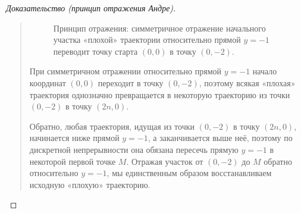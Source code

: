 \begin{proof}[Доказательство (принцип отражения Андре)]
\begin{quote}
\begin{figure}[H]
            \caption{Принцип отражения: симметричное отражение начального 
            участка «плохой» траектории относительно прямой $y = -1$ 
            переводит точку старта $(0, 0)$ в точку $(0, -2)$.}
        \end{figure}

        При симметричном отражении относительно прямой $y = -1$ начало 
        координат $(0, 0)$ переходит в точку $(0, -2)$, поэтому всякая 
        «плохая» траектория однозначно превращается в некоторую 
        траекторию из точки $(0, -2)$ в точку $(2n, 0)$.

        Обратно, любая траектория, идущая из точки $(0, -2)$ в точку 
        $(2n, 0)$, начинается ниже прямой $y = -1$, а заканчивается выше 
        неё, поэтому по дискретной непрерывности она обязана пересечь 
        прямую $y = -1$ в некоторой первой точке $M$. Отражая участок от 
        $(0, -2)$ до $M$ обратно относительно $y = -1$, мы единственным 
        образом восстанавливаем исходную «плохую» траекторию.


\end{quote}
\end{proof}
